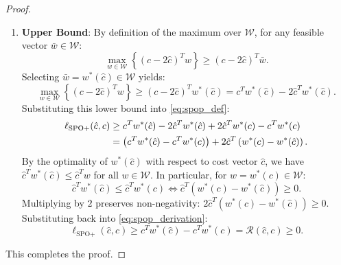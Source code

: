 \documentclass[11pt,a4paper]{article}
\theoremstyle{definition}
\theoremstyle{remark}
\begin{document}
\begin{proof}
\begin{enumerate}[label=\textbf{Part \arabic*.},wide=0pt]
    \item \textbf{Upper Bound}: By definition of the maximum over $\mathcal{W}$, for any feasible vector $\bar{w} \in \mathcal{W}$:
    \begin{equation*}
        \max_{w \in \mathcal{W}} \left\{ (c - 2\hat{c})^T w \right\} \ge (c - 2\hat{c})^T \bar{w}.
    \end{equation*}
    Selecting $\bar{w} = w^*(\hat{c}) \in \mathcal{W}$ yields:
    \begin{equation*}
        \max_{w \in \mathcal{W}} \left\{ (c - 2\hat{c})^T w \right\} \ge (c - 2\hat{c})^T w^*(\hat{c}) = c^T w^*(\hat{c}) - 2\hat{c}^T w^*(\hat{c}).
    \end{equation*}
    Substituting this lower bound into \eqref{eq:spop_def}:
    \begin{align}
        \ell_{\text{SPO}+}(\hat{c}, c) &\ge c^T w^*(\hat{c}) - 2\hat{c}^T w^*(\hat{c}) + 2\hat{c}^T w^*(c) - c^T w^*(c) \notag \\
        &= \left( c^T w^*(\hat{c}) - c^T w^*(c) \right) + 2 \hat{c}^T \left( w^*(c) - w^*(\hat{c}) \right). \label{eq:spop_derivation}
    \end{align}
    By the optimality of $w^*(\hat{c})$ with respect to cost vector $\hat{c}$, we have $\hat{c}^T w^*(\hat{c}) \le \hat{c}^T w$ for all $w \in \mathcal{W}$. In particular, for $w = w^*(c) \in \mathcal{W}$:
    \begin{equation*}
        \hat{c}^T w^*(\hat{c}) \le \hat{c}^T w^*(c) \iff \hat{c}^T \left( w^*(c) - w^*(\hat{c}) \right) \ge 0.
    \end{equation*}
    Multiplying by $2$ preserves non-negativity: $2 \hat{c}^T (w^*(c) - w^*(\hat{c})) \ge 0$. Substituting back into \eqref{eq:spop_derivation}:
    \begin{equation*}
        \ell_{\text{SPO}+}(\hat{c}, c) \ge c^T w^*(\hat{c}) - c^T w^*(c) = \mathcal{R}(\hat{c}, c) \ge 0.
    \end{equation*}
\end{enumerate}
This completes the proof.
\end{proof}
\end{document}
